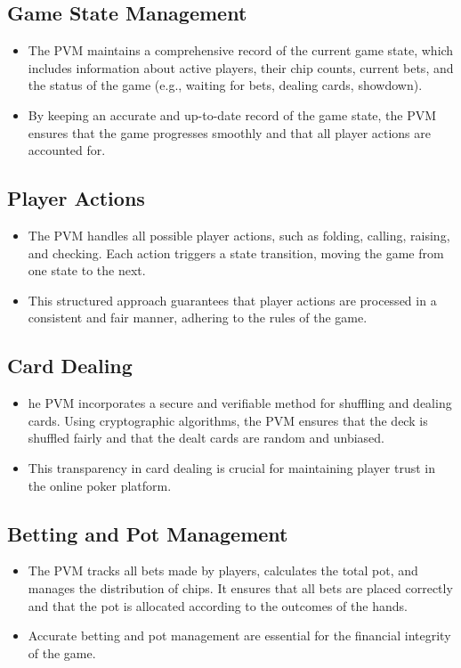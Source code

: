 \documentclass{article}
\begin{document}
\subsection{Game State Management}
\begin{itemize}
    \item The PVM maintains a comprehensive record of the current game state, which includes information about active players, their chip counts, current bets, and the status of the game (e.g., waiting for bets, dealing cards, showdown).
    \item By keeping an accurate and up-to-date record of the game state, the PVM ensures that the game progresses smoothly and that all player actions are accounted for.
\end{itemize}

\subsection{Player Actions}
\begin{itemize}
    \item The PVM handles all possible player actions, such as folding, calling, raising, and checking. Each action triggers a state transition, moving the game from one state to the next.
    \item This structured approach guarantees that player actions are processed in a consistent and fair manner, adhering to the rules of the game.
\end{itemize}

\subsection{Card Dealing}
\begin{itemize}
    \item he PVM incorporates a secure and verifiable method for shuffling and dealing cards. Using cryptographic algorithms, the PVM ensures that the deck is shuffled fairly and that the dealt cards are random and unbiased.
    \item This transparency in card dealing is crucial for maintaining player trust in the online poker platform.
\end{itemize}

\subsection{Betting and Pot Management}
\begin{itemize}
    \item The PVM tracks all bets made by players, calculates the total pot, and manages the distribution of chips. It ensures that all bets are placed correctly and that the pot is allocated according to the outcomes of the hands.
    \item Accurate betting and pot management are essential for the financial integrity of the game.
\end{itemize}
\end{document}
